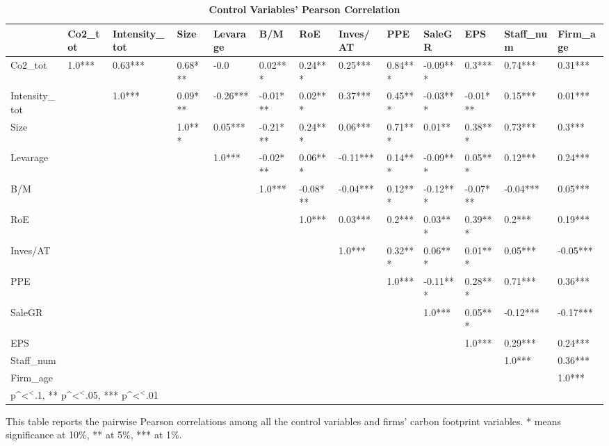 \documentclass[12pt]{article}
\begin{document}
\begin{landscape}
\begin{table}[!ht]
\scriptsize
\centering
\def\sym#1{\ifmmode^{#1}\else\(^{#1}\)\fi}
\caption{\textbf{Control Variables' Pearson Correlation}}
\label{tab: corr}
\begin{tabular}{lllllllllllll}
\toprule
 & Co2\_tot & Intensity\_tot & Size & Levarage & B/M & RoE & Inves/AT & PPE & SaleGR & EPS & Staff\_num & Firm\_age \\
 \hline
Co2\_tot & 1.0*** & 0.63*** & 0.68*** & -0.0 & 0.02*** & 0.24*** & 0.25*** & 0.84*** & -0.09*** & 0.3*** & 0.74*** & 0.31*** \\
Intensity\_tot &  & 1.0*** & 0.09*** & -0.26*** & -0.01*** & 0.02*** & 0.37*** & 0.45*** & -0.03*** & -0.01*** & 0.15*** & 0.01*** \\
Size &  &  & 1.0*** & 0.05*** & -0.21*** & 0.24*** & 0.06*** & 0.71*** & 0.01** & 0.38*** & 0.73*** & 0.3*** \\
Levarage &  &  &  & 1.0*** & -0.02*** & 0.06*** & -0.11*** & 0.14*** & -0.09*** & 0.05*** & 0.12*** & 0.24*** \\
B/M &  &  &  &  & 1.0*** & -0.08*** & -0.04*** & 0.12*** & -0.12*** & -0.07*** & -0.04*** & 0.05*** \\
RoE &  &  &  &  &  & 1.0*** & 0.03*** & 0.2*** & 0.03*** & 0.39*** & 0.2*** & 0.19*** \\
Inves/AT &  &  &  &  &  &  & 1.0*** & 0.32*** & 0.06*** & 0.01*** & 0.05*** & -0.05*** \\
PPE &  &  &  &  &  &  &  & 1.0*** & -0.11*** & 0.28*** & 0.71*** & 0.36*** \\
SaleGR &  &  &  &  &  &  &  &  & 1.0*** & 0.05*** & -0.12*** & -0.17*** \\
EPS &  &  &  &  &  &  &  &  &  & 1.0*** & 0.29*** & 0.24*** \\
Staff\_num &  &  &  &  &  &  &  &  &  &  & 1.0*** & 0.36*** \\
Firm\_age &  &  &  &  &  &  &  &  &  &  &  & 1.0*** \\
\bottomrule
\multicolumn{7}{l}{\footnotesize * p\sym{<}.1, ** p\sym{<}.05, *** p\sym{<}.01}
\end{tabular}
\begin{tablenotes}
    \item This table reports the pairwise Pearson correlations among all the control variables and firms' carbon footprint variables. * means significance at 10\%, ** at 5\%, *** at 1\%.
\end{tablenotes}
\end{table}
\end{landscape}
\end{document}
